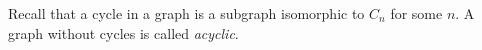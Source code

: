 

\setcounter{section}{2}
\setcounter{subsection}{1}
\setcounter{dfn}{0}

Recall that a cycle in a graph is a subgraph isomorphic to $C_n$ for some $n$.
A graph without cycles is called \emph{acyclic}.


